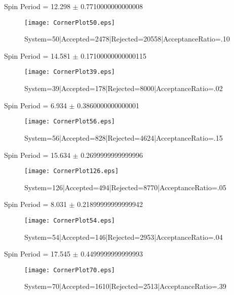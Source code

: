 \documentclass[10pt]{article}
\begin{document}
\begin{center}
        Spin Period = 12.298 $\pm$ 0.7710000000000008
        \end{center}
\begin{figure}[h] 
        \texttt{[image: CornerPlot50.eps]}
        \caption{System=50|Accepted=2478|Rejected=20558|AcceptanceRatio=.10}
        \label{S50}
        \centering
        \end{figure}
\begin{center}
        Spin Period = 14.581 $\pm$ 0.17100000000000115
        \end{center}
\begin{figure}[h] 
        \texttt{[image: CornerPlot39.eps]}
        \caption{System=39|Accepted=178|Rejected=8000|AcceptanceRatio=.02}
        \label{S39}
        \centering
        \end{figure}
\begin{center}
        Spin Period = 6.934 $\pm$ 0.3860000000000001
        \end{center}
\begin{figure}[h] 
        \texttt{[image: CornerPlot56.eps]}
        \caption{System=56|Accepted=828|Rejected=4624|AcceptanceRatio=.15}
        \label{S56}
        \centering
        \end{figure}
\begin{center}
        Spin Period = 15.634 $\pm$ 0.2699999999999996
        \end{center}
\begin{figure}[h] 
        \texttt{[image: CornerPlot126.eps]}
        \caption{System=126|Accepted=494|Rejected=8770|AcceptanceRatio=.05}
        \label{S126}
        \centering
        \end{figure}
\begin{center}
        Spin Period = 8.031 $\pm$ 0.21899999999999942
        \end{center}
\begin{figure}[h] 
        \texttt{[image: CornerPlot54.eps]}
        \caption{System=54|Accepted=146|Rejected=2953|AcceptanceRatio=.04}
        \label{S54}
        \centering
        \end{figure}
\begin{center}
        Spin Period = 17.545 $\pm$ 0.4499999999999993
        \end{center}
\begin{figure}[h] 
        \texttt{[image: CornerPlot70.eps]}
        \caption{System=70|Accepted=1610|Rejected=2513|AcceptanceRatio=.39}
        \label{S70}
        \centering
        \end{figure}
\end{document}
